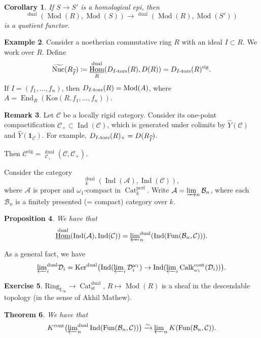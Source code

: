 \documentclass[draft]{amsart}
\newcommand{\EE}{\mathbb{E}}
\newcommand{\ul}[1]{\underline{#1}}
\newcommand{\wh}[1]{\widehat{#1}}
\newcommand{\wt}[1]{\widetilde{#1}}
\newcommand{\cat}[1]{\mathcal{#1}}
\newcommand{\isoto}{\mathbin{\xrightarrow{\sim}}}
\newcommand{\one}{\mathbf{1}}
\DeclareMathOperator{\iHom}{\ul{Hom}}
\DeclareMathOperator{\End}{End}
\DeclareMathOperator{\Ind}{Ind}
\DeclareMathOperator{\Nuc}{Nuc}
\DeclareMathOperator{\Cat}{Cat}
\DeclareMathOperator{\Fun}{Fun}
\DeclareMathOperator{\Mod}{Mod}
\DeclareMathOperator{\Calk}{Calk}
\DeclareMathOperator{\Ker}{Ker}
\newtheorem{thm}{Theorem}[section]
\newtheorem{prop}[thm]{Proposition}
\newtheorem{cor}[thm]{Corollary}
\theoremstyle{definition}
\newtheorem{rem}[thm]{Remark}
\newtheorem{ex}[thm]{Example}
\newtheorem{exercise}[thm]{Exercise}
\begin{document}
\begin{cor}
If $S\to S'$ is a homological epi,  then
\[
\iHom^{\mathrm{dual}}(\Mod(R), \Mod(S)) \to \iHom^{\mathrm{dual}}(\Mod(R), \Mod(S'))
\]
is a quotient functor.
\end{cor}

\begin{ex}
Consider a noetherian commutative ring $R$ with an ideal $I\subset R$. We work over $R$. Define
\[
\wt{\Nuc}(R_{\wh{I}}) \coloneqq \iHom^{\mathrm{dual}}_R(D_{\textnormal{$I$-tors}} (R), D(R)) = D_{\textnormal{$I$-tors}}(R)^{\mathrm{rig}}.
\]
If $I = (f_1,\dotsc,f_n)$, then $D_{\textnormal{$I$-tors}}(R) = \Mod(A)$, where $A = \End_R(\mathrm{Kos}(R, f_1,\dotsc,f_n))$.
\end{ex}

\begin{rem}
Let $\cat C$ be a locally rigid category. Consider its one-point compactification $\cat C_+ \subset \Ind(\cat C)$, which is generated under colimits by $\wh{Y}(\cat C)$ and $\wh{Y}(\one_{\cat C})$. For example, $D_{\textnormal{$I$-tors}}(R)_+ = D(R_{\wh{I}})$.

Then $\cat C^{\mathrm{rig}} = \iHom^{\mathrm{dual}}_{\cat C_+}(\cat C, \cat C_+)$.
\end{rem}

Consider the category
\[
\iHom^{\mathrm{dual}}_k(\Ind(\cat A), \Ind(\cat C)),
\]
where $\cat A$ is proper and $\omega_1$-compact in $\Cat^{\mathrm{perf}}_k$. Write $\cat A = \varinjlim_n \cat B_n$, where each $\cat B_n$ is a finitely presented (= compact) category over $k$.

\begin{prop}
We have that
\[
\iHom^{\mathrm{dual}}(\Ind(\cat A), \Ind(\cat C)) = \textstyle{\varprojlim_n^{\mathrm{dual}}}(\Ind(\Fun(\cat B_n, \cat C))).
\]
\end{prop}

As a general fact, we have 
\[
\textstyle{\varprojlim_i^{\mathrm{dual}}}\cat D_i = \Ker^{\mathrm{dual}}\bigl(\Ind(\varprojlim_i \cat D_i^{\omega_1}) \to \Ind(\varprojlim_i \Calk_{\omega_1}^{\mathrm{cont}}(\cat D_i))\bigr).
\]

\begin{exercise}
$\mathrm{Ring}_{\EE_\infty} \to \Cat^{\mathrm{dual}}_{\mathrm{st}}$, $R\mapsto \Mod(R)$ is a sheaf in the descendable topology (in the sense of Akhil Mathew).
\end{exercise}

\begin{thm}
We have that
\[
K^{\mathrm{cont}} \bigl(\textstyle{\varprojlim^{\mathrm{dual}}_n}\Ind(\Fun(\cat B_n, \cat C))\bigr) \isoto \varprojlim_n K(\Fun(\cat B_n, \cat C)).
\]
\end{thm}
\end{document}
